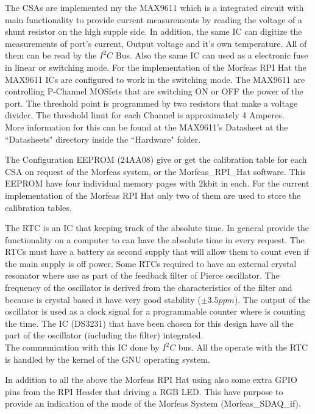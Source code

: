 The CSAs are implemented my the MAX9611 which is a integrated circuit with main functionality to provide current measurements by reading the voltage of a shunt resistor on the high supple side.
In addition, the same IC can digitize the measurements of port's current, Output voltage and it's own temperature. All of them can be read by the $I^2C$ Bus.
Also the same IC can used as a electronic fuse in linear or switching mode. For the implementation of the Morfeas RPI Hat the MAX9611 ICs are configured to work in the switching mode.
The MAX9611 are controlling P-Channel MOSfets that are switching ON or OFF the power of the port.
The threshold point is programmed by two resistors that make a voltage divider. The threshold limit for each Channel is approximately 4 Amperes.\\
More information for this can be found at the MAX9611's Datasheet at the ``Datasheets" directory inside the ``Hardware" folder.

The Configuration EEPROM (24AA08) give or get the calibration table for each CSA on request of the Morfeas system, or the Morfeas\_RPI\_Hat software.
This EEPROM have four individual memory pages with 2kbit in each.
For the current implementation of the Morfeas RPI Hat only two of them are used to store the calibration tables.

The RTC is an IC that keeping track of the absolute time. In general provide the functionality on a computer to can have the absolute time in every request.
The RTCs must have a battery as second supply that will allow them to count even if the main supply is off power.
Some RTCs required to have an external crystal resonator where use as part of the feedback filter of Pierce oscillator.
The frequency of the oscillator is derived from the characteristics of the filter and because is crystal based it have very good stability ($\pm3.5ppm$).
The output of the oscillator is used as a clock signal for a programmable counter where is counting the time. The IC (DS3231) that have been chosen for this design have all the part of the oscillator (including the filter) integrated.\\
The communication with this IC done by $I^2C$ bus. All the operate with the RTC is handled by the kernel of the GNU operating system.

In addition to all the above the Morfeas RPI Hat using also some extra GPIO pins from the RPI Header that driving a RGB LED.
This have purpose to provide an indication of the mode of the Morfeas System (Morfeas\_SDAQ\_if).


